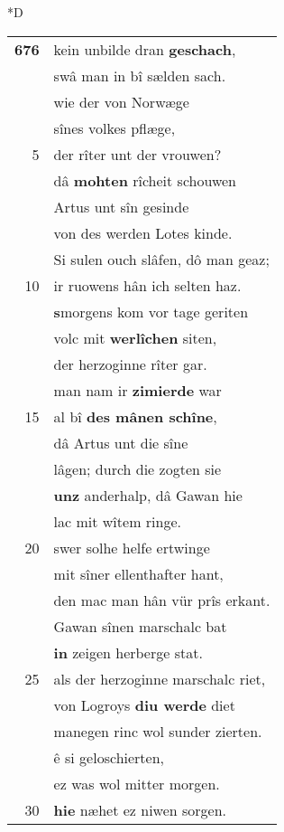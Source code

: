 \documentclass[8pt,a4paper,notitlepage]{article}
\begin{document}
\begin{table}[ht]
\begin{minipage}[t]{0.5\linewidth}
\small
\begin{center}*D
\end{center}
\begin{tabular}{rl}
\textbf{676} & kein unbilde dran \textbf{geschach},\\ 
 & swâ man in bî sælden sach.\\ 
 & wie der von Norwæge\\ 
 & sînes volkes pflæge,\\ 
5 & der rîter unt der vrouwen?\\ 
 & dâ \textbf{mohten} rîcheit schouwen\\ 
 & Artus unt sîn gesinde\\ 
 & von des werden Lotes kinde.\\ 
 & Si sulen ouch slâfen, dô man geaz;\\ 
10 & ir ruowens hân ich selten haz.\\ 
 & \textbf{s}morgens kom vor tage geriten\\ 
 & volc mit \textbf{werlîchen} siten,\\ 
 & der herzoginne rîter gar.\\ 
 & man nam ir \textbf{zimierde} war\\ 
15 & al bî \textbf{des mânen schîne},\\ 
 & dâ Artus unt die sîne\\ 
 & lâgen; durch die zogten sie\\ 
 & \textbf{unz} anderhalp, dâ Gawan hie\\ 
 & lac mit wîtem ringe.\\ 
20 & swer solhe helfe ertwinge\\ 
 & mit sîner ellenthafter hant,\\ 
 & den mac man hân vür prîs erkant.\\ 
 & Gawan sînen marschalc bat\\ 
 & \textbf{in} zeigen herberge stat.\\ 
25 & als der herzoginne marschalc riet,\\ 
 & von Logroys \textbf{diu werde} diet\\ 
 & manegen rinc wol sunder zierten.\\ 
 & ê si geloschierten,\\ 
 & ez was wol mitter morgen.\\ 
30 & \textbf{hie} næhet ez niwen sorgen.\\ 

\end{tabular}
\end{minipage}
\end{table}
\end{document}
